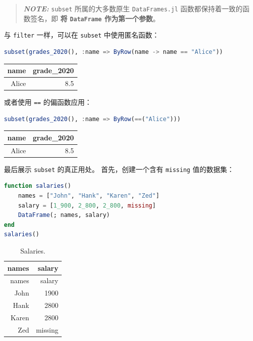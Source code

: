 \documentclass[
  notoc %
]{tufte-book}
\newcommand{\passthrough}[1]{#1}
\begin{document}
\begin{quote}
\textbf{\emph{NOTE:}} \passthrough{\lstinline!subset!} 所属的大多数原生
\passthrough{\lstinline!DataFrames.jl!} 函数都保持着一致的函数签名，即
\textbf{将 \passthrough{\lstinline!DataFrame!} 作为第一个参数}。
\end{quote}

与 \passthrough{\lstinline!filter!} 一样，可以在
\passthrough{\lstinline!subset!} 中使用匿名函数：

\begin{lstlisting}[language=Julia]
subset(grades_2020(), :name => ByRow(name -> name == "Alice"))
\end{lstlisting}

\begin{longtable}[]{@{}rr@{}}
\toprule
name & grade\_2020 \\
\midrule
\endhead
Alice & 8.5 \\
\bottomrule
\end{longtable}

或者使用 \passthrough{\lstinline!==!} 的偏函数应用：

\begin{lstlisting}[language=Julia]
subset(grades_2020(), :name => ByRow(==("Alice")))
\end{lstlisting}

\begin{longtable}[]{@{}rr@{}}
\toprule
name & grade\_2020 \\
\midrule
\endhead
Alice & 8.5 \\
\bottomrule
\end{longtable}

最后展示 \passthrough{\lstinline!subset!} 的真正用处。
首先，创建一个含有 \passthrough{\lstinline!missing!} 值的数据集：

\begin{lstlisting}[language=Julia]
function salaries()
    names = ["John", "Hank", "Karen", "Zed"]
    salary = [1_900, 2_800, 2_800, missing]
    DataFrame(; names, salary)
end
salaries()
\end{lstlisting}

\hypertarget{tbl:salaries}{}
\begin{longtable}[]{@{}rr@{}}
\caption{\label{tbl:salaries}Salaries.}\tabularnewline
\toprule
names & salary \\
\midrule
\endfirsthead
\toprule
names & salary \\
\midrule
\endhead
John & 1900 \\
Hank & 2800 \\
Karen & 2800 \\
Zed & missing \\
\bottomrule
\end{longtable}
\end{document}
